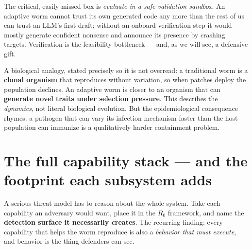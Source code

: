 \documentclass[11pt,a4paper]{article}
\begin{document}
The critical, easily-missed box is \emph{evaluate in a safe validation sandbox}. An adaptive worm cannot trust its own generated code any more than the rest of us can trust an LLM's first draft; without an onboard verification step it would mostly generate confident nonsense and announce its presence by crashing targets. Verification is the feasibility bottleneck --- and, as we will see, a defensive gift.

A biological analogy, stated precisely so it is not overread: a traditional worm is a \textbf{clonal organism} that reproduces without variation, so when patches deploy the population declines. An adaptive worm is closer to an organism that can \textbf{generate novel traits under selection pressure}. This describes the \emph{dynamics}, not literal biological evolution. But the epidemiological consequence rhymes: a pathogen that can vary its infection mechanism faster than the host population can immunize is a qualitatively harder containment problem.

\section{The full capability stack --- and the footprint each subsystem adds}

A serious threat model has to reason about the whole system. Take each capability an adversary would want, place it in the $R_0$ framework, and name the \textbf{detection surface it necessarily creates}. The recurring finding: every capability that helps the worm reproduce is also a \emph{behavior that must execute}, and behavior is the thing defenders can see.
\end{document}
